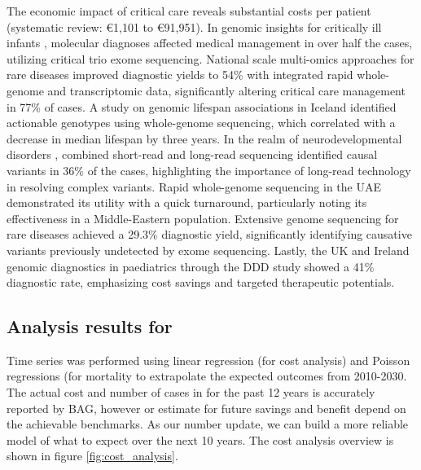 The economic impact of critical care \citep{van2022hospital} reveals substantial costs per patient (systematic review: €1,101 to €91,951). In genomic insights for critically ill infants \citep{meng2017use}, molecular diagnoses affected medical management in over half the cases, utilizing critical trio exome sequencing. National scale multi-omics approaches for rare diseases \citep{lunke2023integrated} improved diagnostic yields to 54\% with integrated rapid whole-genome and transcriptomic data, significantly altering critical care management in 77\% of cases. A study on genomic lifespan associations in Iceland \citep{jensson2023actionable} identified actionable genotypes using whole-genome sequencing, which correlated with a decrease in median lifespan by three years. In the realm of neurodevelopmental disorders \citep{sanchis2023genome}, combined short-read and long-read sequencing identified causal variants in 36\% of the cases, highlighting the importance of long-read technology in resolving complex variants. Rapid whole-genome sequencing in the UAE \citep{abou2023rapid} demonstrated its utility with a quick turnaround, particularly noting its effectiveness in a Middle-Eastern population. Extensive genome sequencing for rare diseases \citep{wojcik2024genome} achieved a 29.3\% diagnostic yield, significantly identifying causative variants previously undetected by exome sequencing. Lastly, the UK and Ireland genomic diagnostics in paediatrics \citep{wright2023genomic} through the DDD study showed a 41\% diagnostic rate, emphasizing cost savings and targeted therapeutic potentials.

\subsection{Analysis results for \pmu}
Time series was performed using linear regression (for cost analysis) and Poisson regressions (for mortality  to extrapolate the expected outcomes from 2010-2030.
The actual cost and number of cases in for the past 12 years is accurately reported by BAG, however or estimate for future savings and benefit depend on the achievable benchmarks.
As our number update, we can build a more reliable model of what to expect over the next 10 years. 
The \pmu cost analysis overview is shown in figure 
\ref{fig:cost_analysis}.

